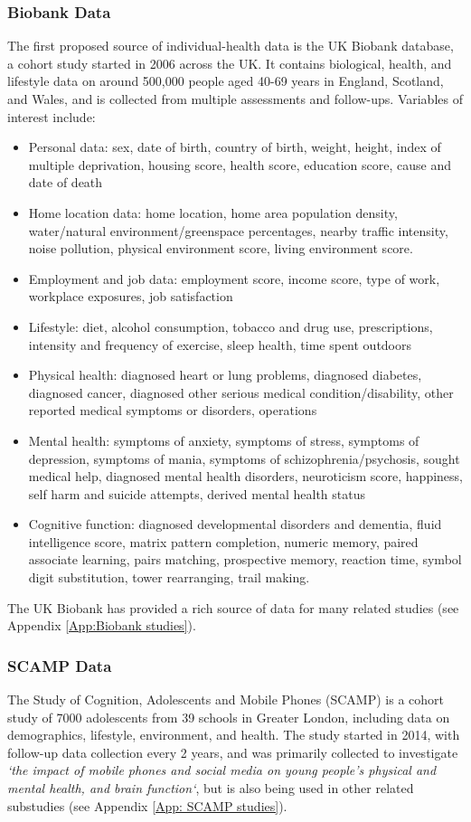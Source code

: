\subsubsection{Biobank Data}
The first proposed source of individual-health data is the UK Biobank database, a cohort study started in 2006 across the UK. It contains biological, health, and lifestyle data on around 500,000 people aged 40-69 years in England, Scotland, and Wales, and is collected from multiple assessments and follow-ups. Variables of interest include:
\begin{itemize}
    \item Personal data: sex, date of birth, country of birth, weight, height, index of multiple deprivation, housing score, health score, education score, cause and date of death
    \item Home location data: home location, home area population density, water/natural environment/greenspace percentages, nearby traffic intensity, noise pollution, physical environment score, living environment score.
    \item Employment and job data: employment score, income score, type of work, workplace exposures, job satisfaction
    \item Lifestyle: diet, alcohol consumption, tobacco and drug use, prescriptions, intensity and frequency of exercise, sleep health, time spent outdoors
    \item Physical health: diagnosed heart or lung problems, diagnosed diabetes, diagnosed cancer, diagnosed other serious medical condition/disability, other reported medical symptoms or disorders, operations
    \item Mental health: symptoms of anxiety, symptoms of stress, symptoms of depression, symptoms of mania, symptoms of schizophrenia/psychosis, sought medical help, diagnosed mental health disorders, neuroticism score, happiness, self harm and suicide attempts, derived mental health status
    \item Cognitive function: diagnosed developmental disorders and dementia, fluid intelligence score, matrix pattern completion, numeric memory, paired associate learning, pairs matching, prospective memory, reaction time, symbol digit substitution, tower rearranging, trail making.
\end{itemize}

The UK Biobank has provided a rich source of data for many related studies (see Appendix \ref{App:Biobank studies}).

\subsubsection{SCAMP Data}
The Study of Cognition, Adolescents and Mobile Phones (SCAMP) is a cohort study of 7000 adolescents from 39 schools in Greater London, including data on demographics, lifestyle, environment, and health. The study started in 2014, with follow-up data collection every 2 years, and was primarily collected to investigate \emph{`the impact of mobile phones and social media on young people’s physical and mental health, and brain function`}, but is also being used in other related substudies (see Appendix \ref{App: SCAMP studies}).

